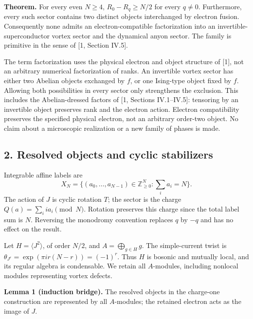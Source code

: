 \documentclass[
  11pt,
]{article}
\begin{document}
\textbf{Theorem.} For every even \(N\ge4\), \(R_0-R_q\ge N/2\) for every
\(q\ne0\). Furthermore, every such sector contains two distinct objects
interchanged by electron fusion. Consequently none admits an
electron-compatible factorization into an invertible-superconductor
vortex sector and the dynamical anyon sector. The family is primitive in
the sense of {[}1, Section IV.5{]}.

The term factorization uses the physical electron and object structure
of {[}1{]}, not an arbitrary numerical factorization of ranks. An
invertible vortex sector has either two Abelian objects exchanged by
\(f\), or one Ising-type object fixed by \(f\). Allowing both
possibilities in every sector only strengthens the exclusion. This
includes the Abelian-dressed factors of {[}1, Sections IV.1--IV.5{]}:
tensoring by an invertible object preserves rank and the electron action.
Electron compatibility preserves the specified physical electron, not
an arbitrary order-two object. No claim
about a microscopic realization or a new family of phases is made.

\subsection{2. Resolved objects and cyclic
stabilizers}\label{resolved-objects-and-cyclic-stabilizers}

Integrable affine labels are \[
X_N=\{(a_0,\ldots,a_{N-1})\in\mathbb Z_{\ge0}^N:\sum_i a_i=N\}.
\] The action of \(J\) is cyclic rotation \(T\); the sector is the
charge \(Q(a)=\sum_i i a_i\pmod N\). Rotation preserves this charge
since the total label sum is \(N\). Reversing the monodromy convention
replaces \(q\) by \(-q\) and has no effect on the result.

Let \(H=\langle J^2\rangle\), of order \(N/2\), and
\(A=\bigoplus_{g\in H}g\). The simple-current twist is
\(\theta_{J^r}=\exp(\pi i r(N-r))=(-1)^r\). Thus \(H\) is bosonic and
mutually local, and its regular algebra is condensable. We retain all
\(A\)-modules, including nonlocal modules representing vortex defects.

\textbf{Lemma 1 (induction bridge).} The resolved objects in the
charge-one construction are represented by all \(A\)-modules; the
retained electron acts as the image of \(J\).
\end{document}
